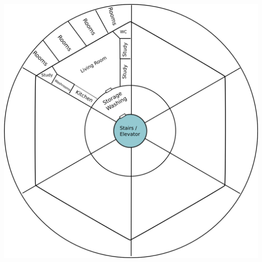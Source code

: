 \documentclass[CSHFoundation.tex]{subfiles}
\begin{document}
\begin{center}
\includegraphics[scale=0.4]{3-community home large.png}
\end{center}
\end{document}
